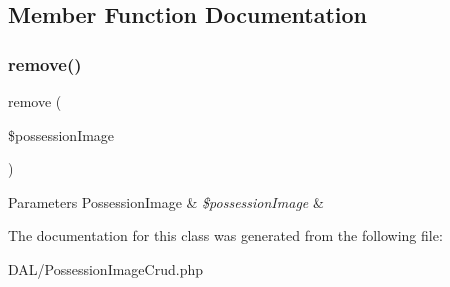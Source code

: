 \subsection{Member Function Documentation}
\mbox{\label{class_app_1_1_d_a_l_1_1_possession_image_crud_a4394e14f5a6ea86ad422eb0ab8a8968b}} 
\subsubsection{\texorpdfstring{remove()}{remove()}}
{\footnotesize\ttfamily remove (\begin{DoxyParamCaption}\item[{\mbox{\hyperlink{class_app_1_1_entity_1_1_possession_image}{Possession\+Image}}}]{\$possession\+Image }\end{DoxyParamCaption})}


\begin{DoxyParams}[1]{Parameters}
Possession\+Image & {\em \$possession\+Image} & \\
\hline
\end{DoxyParams}


The documentation for this class was generated from the following file\+:\begin{DoxyCompactItemize}
\item 
D\+A\+L/Possession\+Image\+Crud.\+php\end{DoxyCompactItemize}
